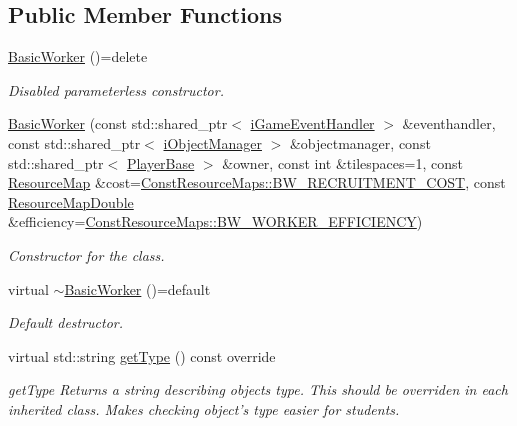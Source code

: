 \subsection*{Public Member Functions}
\begin{DoxyCompactItemize}
\item 
\hyperlink{classCourse_1_1BasicWorker_a066d86fca7e3f10e9ff2bd9f0a2167ff}{Basic\-Worker} ()=delete
\begin{DoxyCompactList}\small\item\em Disabled parameterless constructor. \end{DoxyCompactList}\item 
\hyperlink{classCourse_1_1BasicWorker_a12b697d8a194c9f1a572b93d4e3c40d5}{Basic\-Worker} (const std\-::shared\-\_\-ptr$<$ \hyperlink{classCourse_1_1iGameEventHandler}{i\-Game\-Event\-Handler} $>$ \&eventhandler, const std\-::shared\-\_\-ptr$<$ \hyperlink{classCourse_1_1iObjectManager}{i\-Object\-Manager} $>$ \&objectmanager, const std\-::shared\-\_\-ptr$<$ \hyperlink{classCourse_1_1PlayerBase}{Player\-Base} $>$ \&owner, const int \&tilespaces=1, const \hyperlink{namespaceCourse_ab9a46ed9cd00485e318e5731ea2f78d9}{Resource\-Map} \&cost=\hyperlink{namespaceCourse_1_1ConstResourceMaps_a74eb093a146d0a0d2bfe74ca806e36c2}{Const\-Resource\-Maps\-::\-B\-W\-\_\-\-R\-E\-C\-R\-U\-I\-T\-M\-E\-N\-T\-\_\-\-C\-O\-S\-T}, const \hyperlink{namespaceCourse_a0b96bae1a664dde34efbb1b42dea615e}{Resource\-Map\-Double} \&efficiency=\hyperlink{namespaceCourse_1_1ConstResourceMaps_a895601aa763ac51bf37a0f640eb36c08}{Const\-Resource\-Maps\-::\-B\-W\-\_\-\-W\-O\-R\-K\-E\-R\-\_\-\-E\-F\-F\-I\-C\-I\-E\-N\-C\-Y})
\begin{DoxyCompactList}\small\item\em Constructor for the class. \end{DoxyCompactList}\item 
virtual \hyperlink{classCourse_1_1BasicWorker_a4738d8d4a6c88054355bdd972e1b7aad}{$\sim$\-Basic\-Worker} ()=default
\begin{DoxyCompactList}\small\item\em Default destructor. \end{DoxyCompactList}\item 
virtual std\-::string \hyperlink{classCourse_1_1BasicWorker_a8396e00dafd128cbb86e479296d75c12}{get\-Type} () const override
\begin{DoxyCompactList}\small\item\em get\-Type Returns a string describing objects type. This should be overriden in each inherited class. Makes checking object's type easier for students. \end{DoxyCompactList}\item 

\end{DoxyCompactItemize}
